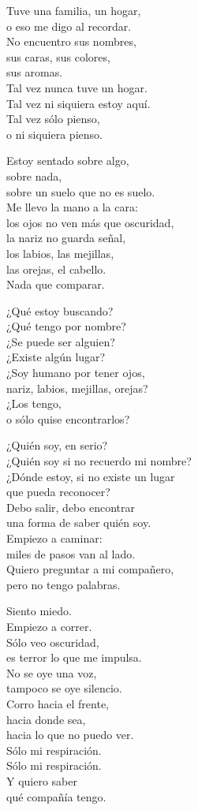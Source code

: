 \begin{lyrics}
Tuve una familia, un hogar,\\
o eso me digo al recordar.\\
No encuentro sus nombres,\\
sus caras, sus colores,\\
sus aromas.\\
Tal vez nunca tuve un hogar.\\
Tal vez ni siquiera estoy aquí.\\
Tal vez sólo pienso,\\
o ni siquiera pienso.

Estoy sentado sobre algo,\\
sobre nada,\\
sobre un suelo que no es suelo.\\
Me llevo la mano a la cara:\\
los ojos no ven más que oscuridad,\\
la nariz no guarda señal,\\
los labios, las mejillas,\\
las orejas, el cabello.\\
Nada que comparar.

¿Qué estoy buscando?\\
¿Qué tengo por nombre?\\
¿Se puede ser alguien?\\
¿Existe algún lugar?\\
¿Soy humano por tener ojos,\\
nariz, labios, mejillas, orejas?\\
¿Los tengo,\\
o sólo quise encontrarlos?

¿Quién soy, en serio?\\
¿Quién soy si no recuerdo mi nombre?\\
¿Dónde estoy, si no existe un lugar\\
que pueda reconocer?\\
Debo salir, debo encontrar\\
una forma de saber quién soy.\\
Empiezo a caminar:\\
miles de pasos van al lado.\\
Quiero preguntar a mi compañero,\\
pero no tengo palabras.

Siento miedo.\\
Empiezo a correr.\\
Sólo veo oscuridad,\\
es terror lo que me impulsa.\\
No se oye una voz,\\
tampoco se oye silencio.\\
Corro hacia el frente,\\
hacia donde sea,\\
hacia lo que no puedo ver.\\
Sólo mi respiración.\\
Sólo mi respiración.\\
Y quiero saber\\
qué compañía tengo.
\end{lyrics}

